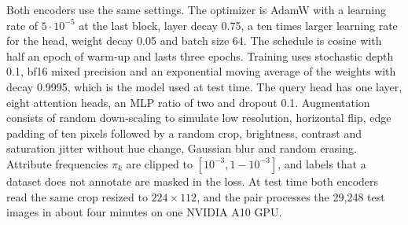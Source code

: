 \documentclass[10pt,twocolumn,letterpaper]{article}
\begin{document}
Both encoders use the same settings. The optimizer is AdamW with a learning rate of $5\cdot10^{-5}$ at the last block, layer decay 0.75, a ten times larger learning rate for the head, weight decay 0.05 and batch size 64. The schedule is cosine with half an epoch of warm-up and lasts three epochs. Training uses stochastic depth 0.1, bf16 mixed precision and an exponential moving average of the weights with decay 0.9995, which is the model used at test time. The query head has one layer, eight attention heads, an MLP ratio of two and dropout 0.1. Augmentation consists of random down-scaling to simulate low resolution, horizontal flip, edge padding of ten pixels followed by a random crop, brightness, contrast and saturation jitter without hue change, Gaussian blur and random erasing. Attribute frequencies $\pi_k$ are clipped to $[10^{-3},1-10^{-3}]$, and labels that a dataset does not annotate are masked in the loss. At test time both encoders read the same crop resized to $224\times112$, and the pair processes the 29{,}248 test images in about four minutes on one NVIDIA A10 GPU.
\end{document}
